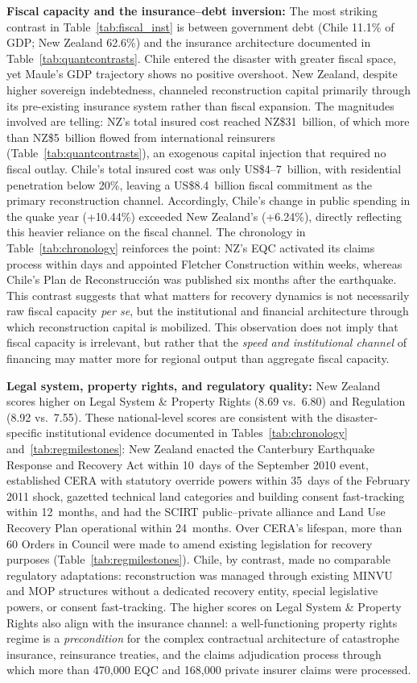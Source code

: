 \textbf{Fiscal capacity and the insurance--debt inversion:} The most striking contrast in Table~\ref{tab:fiscal_inst} is between government debt (Chile 11.1\% of GDP; New Zealand 62.6\%) and the insurance architecture documented in Table~\ref{tab:quantcontrasts}. Chile entered the disaster with greater fiscal space, yet Maule's GDP trajectory shows no positive overshoot. New Zealand, despite higher sovereign indebtedness, channeled reconstruction capital primarily through its pre-existing insurance system rather than fiscal expansion. The magnitudes involved are telling: NZ's total insured cost reached NZ\$31~billion, of which more than NZ\$5~billion flowed from international reinsurers (Table~\ref{tab:quantcontrasts}), an exogenous capital injection that required no fiscal outlay. Chile's total insured cost was only US\$4--7~billion, with residential penetration below 20\%, leaving a US\$8.4~billion fiscal commitment as the primary reconstruction channel. Accordingly, Chile's change in public spending in the quake year (+10.44\%) exceeded New Zealand's (+6.24\%), directly reflecting this heavier reliance on the fiscal channel. The chronology in Table~\ref{tab:chronology} reinforces the point: NZ's EQC activated its claims process within days and appointed Fletcher Construction within weeks, whereas Chile's Plan de Reconstrucci{\'o}n was published six months after the earthquake. This contrast suggests that what matters for recovery dynamics is not necessarily raw fiscal capacity \textit{per se}, but the institutional and financial architecture through which reconstruction capital is mobilized. This observation does not imply that fiscal capacity is irrelevant, but rather that the \textit{speed and institutional channel} of financing may matter more for regional output than aggregate fiscal capacity.

\textbf{Legal system, property rights, and regulatory quality:} New Zealand scores higher on Legal System \& Property Rights (8.69 vs.\ 6.80) and Regulation (8.92 vs.\ 7.55). These national-level scores are consistent with the disaster-specific institutional evidence documented in Tables~\ref{tab:chronology} and~\ref{tab:regmilestones}: New Zealand enacted the Canterbury Earthquake Response and Recovery Act within 10~days of the September 2010 event, established CERA with statutory override powers within 35~days of the February 2011 shock, gazetted technical land categories and building consent fast-tracking within 12~months, and had the SCIRT public--private alliance and Land Use Recovery Plan operational within 24~months. Over CERA's lifespan, more than 60 Orders in Council were made to amend existing legislation for recovery purposes (Table~\ref{tab:regmilestones}). Chile, by contrast, made no comparable regulatory adaptations: reconstruction was managed through existing MINVU and MOP structures without a dedicated recovery entity, special legislative powers, or consent fast-tracking. The higher scores on Legal System \& Property Rights also align with the insurance channel: a well-functioning property rights regime is a \textit{precondition} for the complex contractual architecture of catastrophe insurance, reinsurance treaties, and the claims adjudication process through which more than 470,000 EQC and 168,000 private insurer claims were processed.

